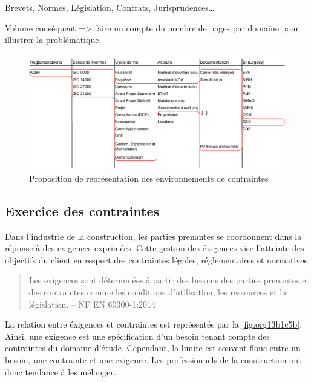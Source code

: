 \documentclass[a4paper,12pt]{article}
\begin{document}
Brevets, Normes, Législation, Contrats, Jurisprudences\ldots{}

Volume conséquent => faire un compte du nombre de pages par domaine pour illustrer la problématique.

\begin{figure}[htbp]
\centering
\includegraphics[width=.9\linewidth]{./svg/360-view-engineering-environment.pdf}
\caption{\label{fig:org95d5bbb}Proposition de représentation des environnements de contraintes}
\end{figure}

\subsection{Exercice des contraintes}
\label{sec:orge98cbad}
Dans l'industrie de la construction, les parties prenantes se coordonnent dans la réponse à des exigences exprimées. Cette gestion des éxigences vise l'atteinte des objectifs du client en respect des contraintes légales, réglementaires et normatives.

\begin{quote}
Les exigences sont déterminées à partir des besoins des parties prenantes et des contraintes comme les conditions d’utilisation, les ressources et la législation. -- NF EN 60300-1:2014\autocite{GestionSureteFonctionnement2014}
\end{quote}

La relation entre éxigences et contraintes est représentée par la \ref{fig:org13b1c5b}. Ainsi, une exigence est une spécification d'un besoin tenant compte des contraintes du domaine d'étude. Cependant, la limite est souvent floue entre un besoin, une contrainte et une exigence. Les professionnels de la construction ont donc tendance à les mélanger.
\end{document}

